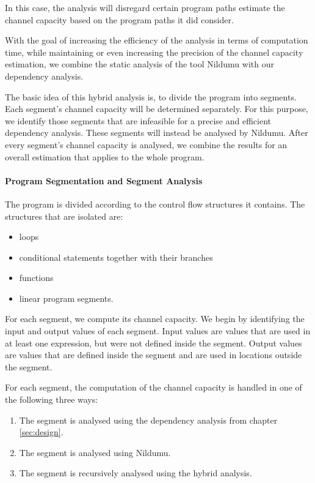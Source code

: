 In this case, the analysis will disregard certain program paths estimate the channel capacity based on the program paths it did consider.

With the goal of increasing the efficiency of the analysis in terms of computation time, while maintaining or even increasing the precision of the channel capacity estimation, we combine the static analysis of the tool Nildumu \cite{bechberger18} with our dependency analysis.

The basic idea of this hybrid analysis is, to divide the program into segments. Each segment's channel capacity will be determined separately. For this purpose, we identify those segments that are infeasible for a precise and efficient dependency analysis. These segments will instead be analysed by Nildumu. After every segment's channel capacity is analysed, we combine the results for an overall estimation that applies to the whole program.

\paragraph{Program Segmentation and Segment Analysis}
The program is divided according to the control flow structures it contains. The structures that are isolated are:
\begin{itemize}
    \setlength\itemsep{0em}
    \item loops
    \item conditional statements together with their branches
    \item functions
    \item linear program segments.
\end{itemize}

For each segment, we compute its channel capacity. We begin by identifying the input and output values of each segment. Input values are values that are used in at least one expression, but were not defined inside the segment. Output values are values that are defined inside the segment and are used in locations outside the segment.

For each segment, the computation of the channel capacity is handled in one of the following three ways:
\begin{enumerate}
\setlength\itemsep{0em}
    \item The segment is analysed using the dependency analysis from chapter \ref{sec:design}.
    \item The segment is analysed using Nildumu.
    \item The segment is recursively analysed using the hybrid analysis.
\end{enumerate}

